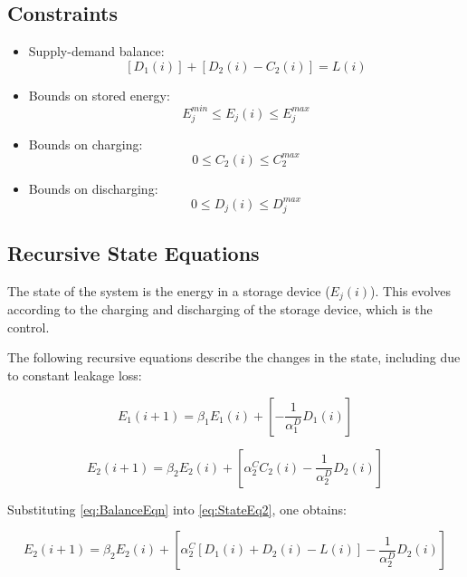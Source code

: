 \documentclass{article}
\begin{document}
	\subsection{Constraints}
	\begin{itemize}
		\item Supply-demand balance: 
		\begin{equation} \label{eq:BalanceEqn}\left[D_{1}(i)\right] + \left[D_{2}(i) - C_{2}(i)\right] = L(i) \end{equation}
						
		\item Bounds on stored energy: 
		\begin{equation}E_{j}^{min}\leq E_{j}(i)\leq E_{j}^{max}\end{equation}
		\item Bounds on charging:
		\begin{equation}0\leq C_{2}(i)\leq C_{2}^{max}\end{equation}
		\item Bounds on discharging:
		\begin{equation}0\leq D_{j}(i)\leq D_{j}^{max}\end{equation}
	\end{itemize}

	\subsection{Recursive State Equations}
	 The state of the system is the energy in a storage device ($E_{j}(i)$). This evolves according to the charging and discharging of the storage device, which is the control.
	 
	 The following recursive equations describe the changes in the state, including due to constant leakage loss:
	 
	 \begin{equation}\label{eq:StateEq1}E_{1}(i+1)=\beta_{1}E_{1}(i)+\left[-\frac{1}{\alpha_{1}^{D}}D_{1}(i)\right] \end{equation}
	 
	 \begin{equation}\label{eq:StateEq2}E_{2}(i+1)=\beta_{2}E_{2}(i)+\left[\alpha_{2}^{C}C_{2}(i)-\frac{1}{\alpha_{2}^{D}}D_{2}(i)\right]\end{equation}
	 
	 Substituting \eqref{eq:BalanceEqn} into \eqref{eq:StateEq2}, one obtains:
	 
	 \begin{equation}\label{eq:DPStateEq2}E_{2}(i+1)=\beta_{2}E_{2}(i)+\left[\alpha_{2}^{C}[D_{1}(i)+D_{2}(i)-L(i)]-\frac{1}{\alpha_{2}^{D}}D_{2}(i)\right]\end{equation}
	 
\end{document}
